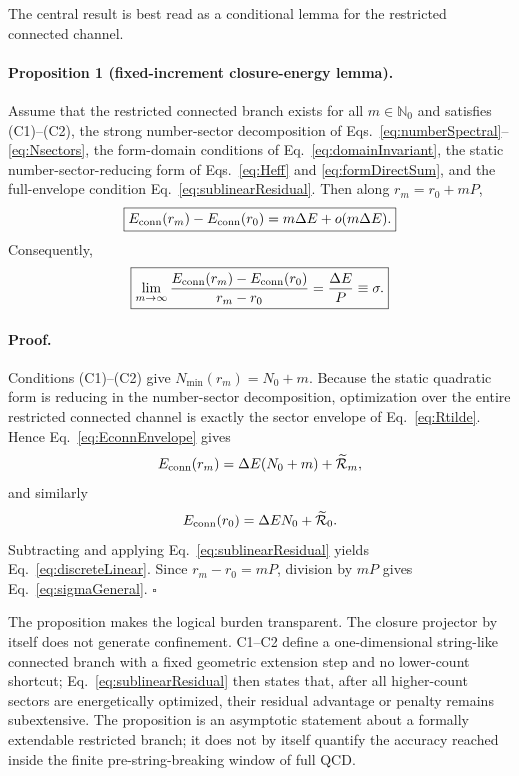 \documentclass[10pt]{article}
\begin{document}
The central result is best read as a conditional lemma for the restricted connected channel.

\paragraph{Proposition 1 (fixed-increment closure-energy lemma).}
Assume that the restricted connected branch exists for all $m\in\mathbb N_0$ and satisfies (C1)--(C2), the strong number-sector decomposition of Eqs.~\eqref{eq:numberSpectral}--\eqref{eq:Nsectors}, the form-domain conditions of Eq.~\eqref{eq:domainInvariant}, the static number-sector-reducing form of Eqs.~\eqref{eq:Heff} and \eqref{eq:formDirectSum}, and the full-envelope condition Eq.~\eqref{eq:sublinearResidual}. Then along $r_m=r_0+mP$,
\begin{equation}
\boxed{
E_{\rm conn}(r_m)-E_{\rm conn}(r_0)
=m\Delta E+o(m\Delta E).
}
\label{eq:discreteLinear}
\end{equation}
Consequently,
\begin{equation}
\boxed{
\lim_{m\to\infty}
\frac{E_{\rm conn}(r_m)-E_{\rm conn}(r_0)}{r_m-r_0}
=\frac{\Delta E}{P}
\equiv\sigma.
}
\label{eq:sigmaGeneral}
\end{equation}

\paragraph{Proof.}
Conditions (C1)--(C2) give $N_{\min}(r_m)=N_0+m$. Because the static quadratic form is reducing in the number-sector decomposition, optimization over the entire restricted connected channel is exactly the sector envelope of Eq.~\eqref{eq:Rtilde}. Hence Eq.~\eqref{eq:EconnEnvelope} gives
\begin{equation}
E_{\rm conn}(r_m)
=\Delta E(N_0+m)+\widetilde{\mathcal R}_m,
\end{equation}
and similarly
\begin{equation}
E_{\rm conn}(r_0)
=\Delta EN_0+\widetilde{\mathcal R}_0.
\end{equation}
Subtracting and applying Eq.~\eqref{eq:sublinearResidual} yields Eq.~\eqref{eq:discreteLinear}. Since $r_m-r_0=mP$, division by $mP$ gives Eq.~\eqref{eq:sigmaGeneral}. \hfill$\square$

The proposition makes the logical burden transparent. The closure projector by itself does not generate confinement. C1--C2 define a one-dimensional string-like connected branch with a fixed geometric extension step and no lower-count shortcut; Eq.~\eqref{eq:sublinearResidual} then states that, after all higher-count sectors are energetically optimized, their residual advantage or penalty remains subextensive. The proposition is an asymptotic statement about a formally extendable restricted branch; it does not by itself quantify the accuracy reached inside the finite pre-string-breaking window of full QCD.
\end{document}

